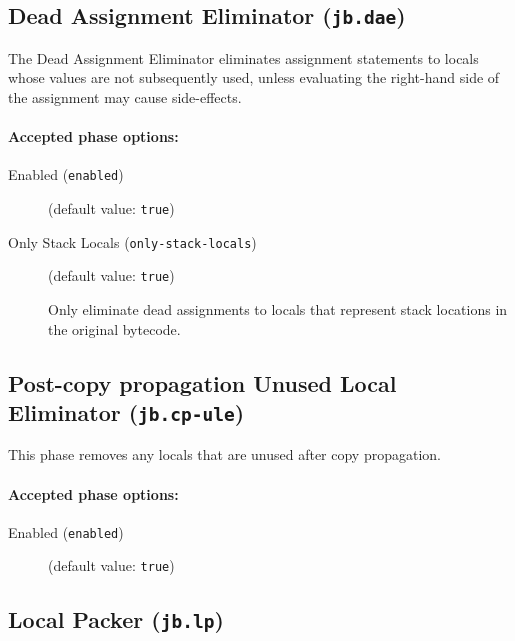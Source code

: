 \documentclass{article}
\begin{document}
\subsection{Dead Assignment Eliminator ({\tt jb.dae})}

The Dead Assignment Eliminator eliminates assignment statements
to locals whose values are not subsequently used, unless
evaluating the right-hand side of the assignment may cause
side-effects.


\paragraph{Accepted phase options:} 

\begin{description}

\item[Enabled ({\tt enabled})]
(default value: {\tt true})






\item[Only Stack Locals ({\tt only-stack-locals})]
(default value: {\tt true})




Only eliminate dead assignments to locals that represent stack
locations in the original bytecode.



\end{description}

\subsection{Post-copy propagation Unused Local Eliminator ({\tt jb.cp-ule})}

This phase removes any locals that are unused after copy propagation.


\paragraph{Accepted phase options:} 

\begin{description}

\item[Enabled ({\tt enabled})]
(default value: {\tt true})






\end{description}

\subsection{Local Packer ({\tt jb.lp})}
\end{document}
